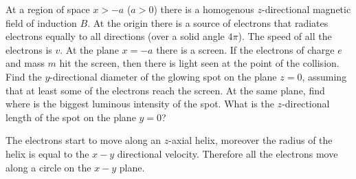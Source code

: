 {\ifEngStatement
At a region of space $x>-a$ ($a>0$) there is a homogenous $z$-directional magnetic field of induction $B$. At the origin there is a source of electrons that radiates electrons equally to all directions (over a solid angle $4\pi$). The speed of all the electrons is $v$. At the plane $x=-a$ there is a screen. If the electrons of charge $e$ and mass $m$ hit the screen, then there is light seen at the point of the collision. Find the $y$-directional diameter of the glowing spot on the plane $z = 0$, assuming that at least some of the electrons reach the screen. At the same plane, find where is the biggest luminous intensity of the spot. What is the $z$-directional length of the spot on the plane $y=0$?
\fi


\ifEngHint
The electrons start to move along an $z$-axial helix, moreover the radius of the helix is equal to the $x-y$ directional velocity. Therefore all the electrons move along a circle on the $x-y$ plane.
\fi


}
